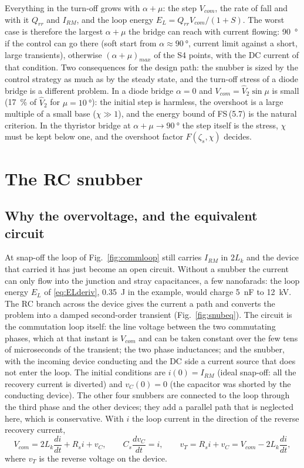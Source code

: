 \documentclass[10pt,a4paper]{scrartcl}
\newcommand{\Lk}{L_{k}}
\newcommand{\fs}[1]{\textsf{FS}\,(#1)}
\begin{document}
Everything in the turn-off grows with $\alpha+\mu$: the step $V_{com}$, the rate of fall and with it $Q_{rr}$ and $I_{RM}$, and the loop energy $E_L = Q_{rr}V_{com}/(1+S)$. The worst case is therefore the largest $\alpha+\mu$ the bridge can reach with current flowing: \SI{90}{\degree} if the control can go there (soft start from $\alpha\approx\SI{90}{\degree}$, current limit against a short, large transients), otherwise $(\alpha+\mu)_{max}$ of the S4 points, with the DC current of that condition. Two consequences for the design path: the snubber is sized by the control strategy as much as by the steady state, and the turn-off stress of a diode bridge is a different problem. In a diode bridge $\alpha = 0$ and $V_{com} = \hat V_2\sin\mu$ is small (\SI{17}{\percent} of $\hat V_2$ for $\mu = \SI{10}{\degree}$): the initial step is harmless, the overshoot is a large multiple of a small base ($\chi\gg1$), and the energy bound of \fs{5.7} is the natural criterion. In the thyristor bridge at $\alpha+\mu\to\SI{90}{\degree}$ the step itself is the stress, $\chi$ must be kept below one, and the overshoot factor $F(\zeta_s,\chi)$ decides.
\section{The RC snubber}\label{sec:snub}
\subsection{Why the overvoltage, and the equivalent circuit}
At snap-off the loop of Fig.~\ref{fig:commloop} still carries $I_{RM}$ in $2\Lk$ and the device that carried it has just become an open circuit. Without a snubber the current can only flow into the junction and stray capacitances, a few nanofarads: the loop energy $E_L$ of \eqref{eq:ELderiv}, \SI{0.35}{J} in the example, would charge \SI{5}{nF} to \SI{12}{kV}. The RC branch across the device gives the current a path and converts the problem into a damped second-order transient (Fig.~\ref{fig:snubeq}). The circuit is the commutation loop itself: the line voltage between the two commutating phases, which at that instant is $V_{com}$ and can be taken constant over the few tens of microseconds of the transient; the two phase inductances; and the snubber, with the incoming device conducting and the DC side a current source that does not enter the loop. The initial conditions are $i(0) = I_{RM}$ (ideal snap-off: all the recovery current is diverted) and $v_C(0) = 0$ (the capacitor was shorted by the conducting device). The other four snubbers are connected to the loop through the third phase and the other devices; they add a parallel path that is neglected here, which is conservative. With $i$ the loop current in the direction of the reverse recovery current,
\begin{equation}
V_{com} = 2\Lk\frac{di}{dt} + R_si + v_C, \qquad C_s\frac{dv_C}{dt} = i, \qquad v_T = R_si + v_C = V_{com} - 2\Lk\frac{di}{dt} ,
\label{eq:snubKVL}
\end{equation}
where $v_T$ is the reverse voltage on the device.
\end{document}
